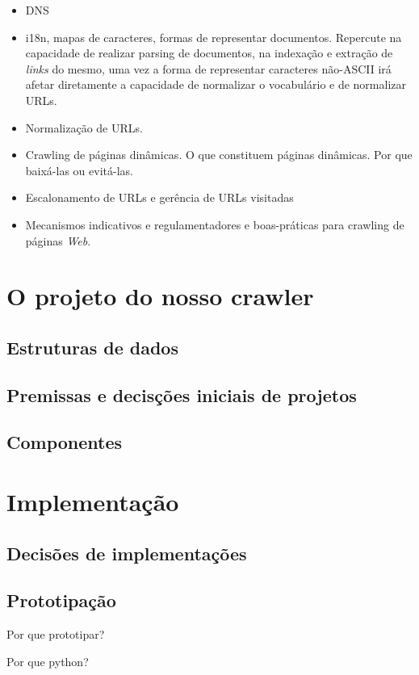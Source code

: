 \documentclass[10pt,twocolumn]{article}
\begin{document}
\begin{itemize}
\item DNS
\item i18n, mapas de caracteres, formas de representar documentos.
Repercute na capacidade de realizar parsing de documentos, na indexação
e extração de \emph{links} do mesmo, uma vez a forma de representar
caracteres não-ASCII irá afetar diretamente a capacidade de normalizar o
vocabulário e de normalizar URLs.
\item Normalização de URLs.
\item Crawling de páginas dinâmicas. O que constituem páginas dinâmicas.
Por que baixá-las ou evitá-las.
\item Escalonamento de URLs e gerência de URLs visitadas
\item Mecanismos indicativos e regulamentadores e boas-práticas para
crawling de páginas \emph{Web}. 
\end{itemize}


\section{O projeto do nosso crawler}

\subsection{Estruturas de dados}
\subsection{Premissas e decisções iniciais de projetos}
\subsection{Componentes}

\section{Implementação}
\subsection{Decisões de implementações}
\subsection{Prototipação}

Por que prototipar?

Por que python?
\end{document}
